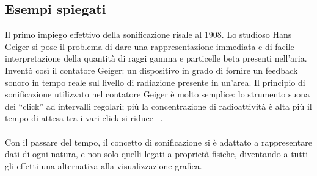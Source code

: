 \subsection{Esempi spiegati}
Il primo impiego effettivo della sonificazione risale al 1908. Lo studioso Hans Geiger si pose il problema di dare una rappresentazione immediata e di facile interpretazione della quantità di raggi gamma e particelle beta presenti nell’aria.
Inventò così il contatore Geiger: un dispositivo in grado di fornire un feedback sonoro in tempo reale sul livello di radiazione presente in un’area.
Il principio di sonificazione utilizzato nel contatore Geiger è molto semplice: lo strumento suona dei “click” ad intervalli regolari; più la concentrazione di radioattività è alta più il tempo di attesa tra i vari click si riduce ~\cite{soni_temporal}.
\\\\
Con il passare del tempo, il concetto di sonificazione si è adattato a rappresentare dati di ogni natura, e non solo quelli legati a proprietà fisiche, diventando a tutti gli effetti una alternativa alla visualizzazione grafica.


